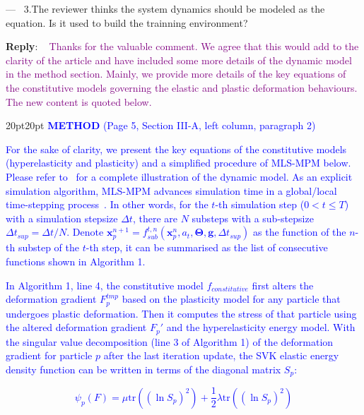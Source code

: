 \documentclass[11pt]{article}
\newcounter{reviewer}
\newcounter{point}[reviewer]
\renewcommand{\thepoint}{P\,\thereviewer.\arabic{point}}
\newenvironment{point}
   {\refstepcounter{point} \bigskip \noindent {\textbf{Reviewer~Point~\thepoint} } ---\ }
   {\par }
\newenvironment{reply}
   {\medskip \noindent \begin{sf}\textbf{Reply}: \  }
   {\medskip \end{sf}}
\newcommand{\rp}[1]{\textcolor{purple}{#1}}
\newcommand{\xt}[1]{\textcolor{blue}{#1}}
\begin{document}
\begin{point}
3.The reviewer thinks the system dynamics should be modeled as the
equation. Is it used to build the trainning environment? 
\end{point}

\begin{reply}
\rp{Thanks for the valuable comment. We agree that this would add to the clarity of the article and have included some more details of the dynamic model in the method section. Mainly, we provide more details of the key equations of the constitutive models governing the elastic and plastic deformation behaviours. The new content is quoted below.}

\begin{adjustwidth}{20pt}{20pt}
\vspace{0.3cm}\noindent\xt{\textbf{METHOD} (Page 5, Section III-A, left column, paragraph 2)}

\xt{For the sake of clarity, we present the key equations of the constitutive models (hyperelasticity and plasticity) and a simplified procedure of MLS-MPM below. Please refer to~\cite{klar2016drucker} for a complete illustration of the dynamic model. As an explicit simulation algorithm, MLS-MPM advances simulation time in a global/local time-stepping process~\cite{hu2018moving}. In other words, for the $t$-th simulation step ($0 < t\leq T$) with a simulation stepsize $\Delta t$, there are $N$ substeps with a sub-stepsize $\Delta t_{sup}=\Delta t / N$. Denote $\pmb{x}^{n+1}_p = f_{sub}^{t,n}(\pmb{x}^n_p, a_t, \pmb{\Theta}, \pmb{g}, \Delta t_{sup})$ as the function of the $n$-th substep of the $t$-th step, it can be summarised as the list of consecutive functions shown in Algorithm 1.}

\xt{In Algorithm 1, line 4, the constitutive model $f_{constitutive}$ first alters the deformation gradient $F^{tmp}_p$ based on the plasticity model for any particle that undergoes plastic deformation. Then it computes the stress of that particle using the altered deformation gradient $F_p'$ and the hyperelasticity energy model. With the singular value decomposition (line 3 of Algorithm 1) of the deformation gradient for particle $p$ after the last iteration update, the SVK elastic energy density function can be written in terms of the diagonal matrix $S_p$:}

\setcounter{equation}{2}
\xt{\begin{equation}\label{eq:SVK}
\psi_p(F) = \mu \mathrm{tr}((\ln S_p)^2) + \frac{1}{2}\lambda \mathrm{tr}((\ln S_p)^2)
\end{equation}}


\end{adjustwidth}
\end{reply}
\end{document}
